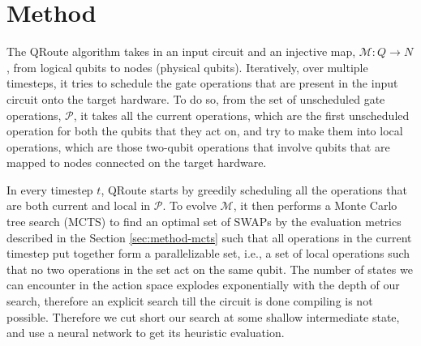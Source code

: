 \documentclass[%
 reprint,
amsmath,amssymb,
pra,
]{revtex4-2}
\begin{document}
\newtheorem{defn}{Definition}[section]

\section{\label{sec:method}Method}

The QRoute algorithm takes in an input circuit and an injective map, $\mathcal{M}: Q \rightarrow N$, from logical qubits to nodes (physical qubits). Iteratively, over multiple timesteps, it tries to schedule the gate operations that are present in the input circuit onto the target hardware. To do so, from the set of unscheduled gate operations, $\mathcal{P}$, it takes all the current operations, which are the first unscheduled operation for both the qubits that they act on, and try to make them into local operations, which are those two-qubit operations that involve qubits that are mapped to nodes connected on the target hardware.

In every timestep $t$, QRoute starts by greedily scheduling all the operations that are both current and local in $\mathcal{P}$. To evolve $\mathcal{M}$, it then performs a Monte Carlo tree search (MCTS) to find an optimal set of SWAPs by the evaluation metrics described in the Section \ref{sec:method-mcts} such that all operations in the current timestep put together form a parallelizable set, i.e., a set of local operations such that no two operations in the set act on the same qubit. The number of states we can encounter in the action space explodes exponentially with the depth of our search, therefore an explicit search till the circuit is done compiling is not possible. Therefore we cut short our search at some shallow intermediate state, and use a neural network to get its heuristic evaluation.



\end{document}
